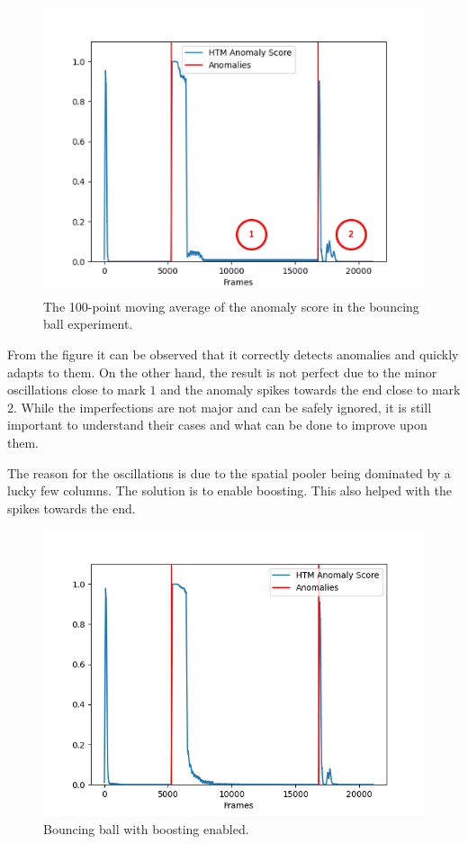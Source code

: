 \begin{figure}[H]
    \centering
    \includegraphics[width=\textwidth]{resources/experiments/bouncing_ball/bb_anoms_bad.png}
    \caption{The 100-point moving average of the anomaly score in the bouncing ball experiment.}
\end{figure}
From the figure it can be observed that it correctly detects anomalies and quickly adapts to them. On the other hand, the result is not perfect due to the minor oscillations close to mark $1$ and the anomaly spikes towards the end close to mark $2$. While the imperfections are not major and can be safely ignored, it is still important to understand their cases and what can be done to improve upon them. \par
The reason for the oscillations is due to the spatial pooler being dominated by a lucky few columns. The solution is to enable boosting. This also helped with the spikes towards the end.\par
\begin{figure}[H]
    \centering
    \includegraphics[width=\textwidth]{resources/experiments/bouncing_ball/bb_anoms_boosting.png}
    \caption{Bouncing ball with boosting enabled.}
\end{figure}
